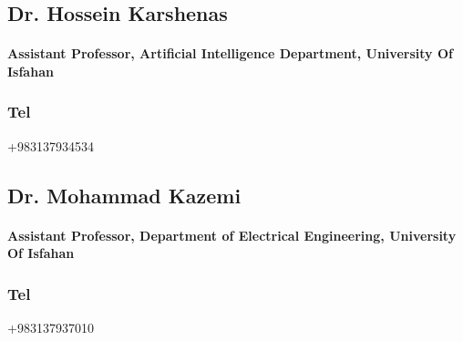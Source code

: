 \documentclass[a4paper]{article}
\begin{document}
        \Large\href{mailto:h.karimpour@eng.ui.ac.ir}{}
        \Large\href{http://eng.ui.ac.ir/~h.karimpour}{}
        \Large\href{https://www.linkedin.com/in/hossein-karimpour-38373811a}{}

        \subsection{Dr. Hossein Karshenas}

        \paragraph{\bfseries Assistant Professor, Artificial Intelligence Department, University Of Isfahan}
        \subsubsection{\large Tel} {\large +983137934534}
        
        \Large\href{mailto:h.karshenas@eng.ui.ac.ir}{}
        \Large\href{https://engold.ui.ac.ir/~h.karshenas}{}
        \Large\href{https://ir.linkedin.com/in/hossein-karshenas-01102a55}{}

        \subsection{Dr. Mohammad Kazemi}

        \paragraph{\bfseries Assistant Professor, Department of Electrical Engineering, University Of Isfahan}
        \subsubsection{\large Tel} {\large +983137937010}
        
        \Large\href{mailto:m.kazemi@eng.ui.ac.ir}{}
        \Large\href{https://engold.ui.ac.ir/~m.kazemi}{}
        \Large\href{https://ir.linkedin.com/in/mohammad-kazemi-602a2722}{}
\end{document}
